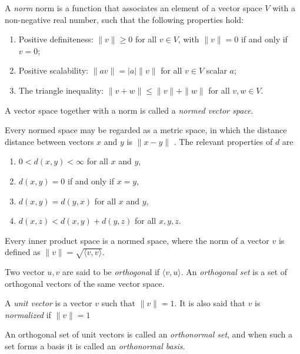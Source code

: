 \begin{definition} \label{def:norm}
  A \emph{norm} \gls{norm} is a function that associates an element of a vector space $V$ with a non-negative real number, such that the following properties hold:
  \begin{enumerate}
    \item Positive definiteness: $\|v\| \geq 0$ for all $v \in V$, with $\|v\| = 0$ if and only if $v = 0$;
    \item Positive scalability: $\|av\| = |a|\|v\|$ for all $v \in V$ scalar $a$;
    \item The triangle inequality: $\|v + w\| \leq \|v\| + \|w\|$ for all $v, w \in V$.
  \end{enumerate}
\end{definition}

\begin{definition}
A vector space together with a norm is called a \emph{normed vector space}.
\end{definition}

Every normed space may be regarded as a metric space, in which the
distance \gls{distance} between vectors $x$ and $y$ is $\|x-y\|$ . The relevant properties of $d$ are

\begin{enumerate}
  \item $0 < d(x, y) < \infty $ for all $x$ and $y$,
  \item $d(x, y) = 0$ if and only if $x = y$,
  \item $d(x, y) = d(y, x)$ for all $x$ and $y$,
  \item $d(x, z) < d(x, y) + d(y, z)$ for all $x, y, z$.
\end{enumerate}


Every inner product space is a normed space, where the norm of a vector $v$ is defined as $\|v\| = \sqrt{\langle v, v \rangle}$.

\begin{definition}
Two vector $u, v$ are said to be \emph{orthogona}l if $\langle v,u\rangle$. An \emph{orthogonal set} is a set of orthogonal vectors of the same vector space.
\end{definition}

\begin{definition}
  A \emph{unit vector} is a vector $v$ such that $\|v\|  = 1$. It is also said that $v$ is \emph{normalized} if $\|v\|  = 1$
\end{definition}

\begin{definition}
  An orthogonal set of unit vectors is called an \emph{orthonormal set}, and when such a set forms a basis it is called an \emph{orthonormal basis}.
\end{definition}

